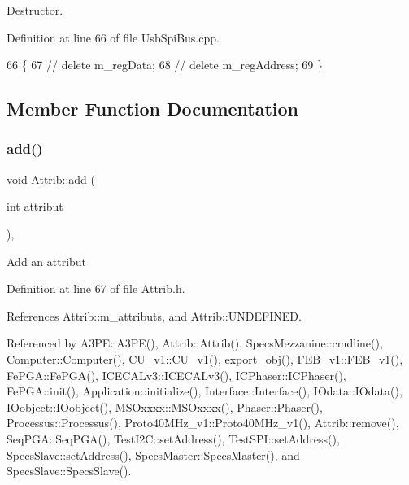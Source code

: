 Destructor. 



Definition at line 66 of file Usb\+Spi\+Bus.\+cpp.


\begin{DoxyCode}
66                       \{
67 \textcolor{comment}{//  delete m\_regData;}
68 \textcolor{comment}{//  delete m\_regAddress;}
69 \}
\end{DoxyCode}


\subsection{Member Function Documentation}
\mbox{\label{classAttrib_a235f773af19c900264a190b00a3b4ad7}} 
\subsubsection{\texorpdfstring{add()}{add()}}
{\footnotesize\ttfamily void Attrib\+::add (\begin{DoxyParamCaption}\item[{int}]{attribut }\end{DoxyParamCaption})\hspace{0.3cm}{\ttfamily [inline]}, {\ttfamily [inherited]}}

Add an attribut 

Definition at line 67 of file Attrib.\+h.



References Attrib\+::m\+\_\+attributs, and Attrib\+::\+U\+N\+D\+E\+F\+I\+N\+ED.



Referenced by A3\+P\+E\+::\+A3\+P\+E(), Attrib\+::\+Attrib(), Specs\+Mezzanine\+::cmdline(), Computer\+::\+Computer(), C\+U\+\_\+v1\+::\+C\+U\+\_\+v1(), export\+\_\+obj(), F\+E\+B\+\_\+v1\+::\+F\+E\+B\+\_\+v1(), Fe\+P\+G\+A\+::\+Fe\+P\+G\+A(), I\+C\+E\+C\+A\+Lv3\+::\+I\+C\+E\+C\+A\+Lv3(), I\+C\+Phaser\+::\+I\+C\+Phaser(), Fe\+P\+G\+A\+::init(), Application\+::initialize(), Interface\+::\+Interface(), I\+Odata\+::\+I\+Odata(), I\+Oobject\+::\+I\+Oobject(), M\+S\+Oxxxx\+::\+M\+S\+Oxxxx(), Phaser\+::\+Phaser(), Processus\+::\+Processus(), Proto40\+M\+Hz\+\_\+v1\+::\+Proto40\+M\+Hz\+\_\+v1(), Attrib\+::remove(), Seq\+P\+G\+A\+::\+Seq\+P\+G\+A(), Test\+I2\+C\+::set\+Address(), Test\+S\+P\+I\+::set\+Address(), Specs\+Slave\+::set\+Address(), Specs\+Master\+::\+Specs\+Master(), and Specs\+Slave\+::\+Specs\+Slave().


